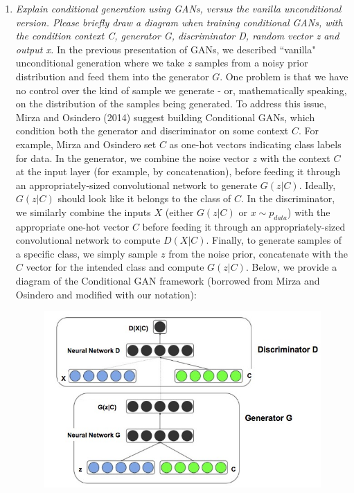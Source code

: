 \documentclass[a4paper]{article}
\begin{document}
\begin{enumerate}
{
}
\item{\textit{Explain conditional generation using GANs, versus the vanilla unconditional version. Please briefly draw a diagram when training conditional GANs, with the condition context C, generator G, discriminator D, random vector z and output x.}
\newline
\newline
In the previous presentation of GANs, we described ``vanilla" unconditional generation where we take $z$ samples from a noisy prior distribution and feed them into the generator $G$. One problem is that we have no control over the kind of sample we generate - or, mathematically speaking, on the distribution of the samples being generated. 
\newline
\newline
To address this issue, Mirza and Osindero (2014) suggest building Conditional GANs, which condition both the generator and discriminator on some context $C$. For example, Mirza and Osindero set $C$ as one-hot vectors indicating class labels for data.
\newline
\newline
In the generator, we combine the noise vector $z$ with the context $C$ at the input layer (for example, by concatenation), before feeding it through an appropriately-sized convolutional network to generate $G(z|C)$. Ideally, $G(z|C)$ should look like it belongs to the class of $C$. In the discriminator, we similarly combine the inputs $X$ (either $G(z|C)$ or $x \sim p_{data}$) with the appropriate one-hot vector $C$ before feeding it through an appropriately-sized convolutional network to compute $D(X|C)$. Finally, to generate samples of a specific class, we simply sample $z$ from the noise prior, concatenate with the $C$ vector for the intended class and compute $G(z|C)$. 
\newline
\newline
Below, we provide a diagram of the Conditional GAN framework (borrowed from Mirza and Osindero and modified with our notation):
\begin{figure}[H]
  \includegraphics[scale=3]{images/my_conditional_gan.jpg}
  \label{fig:boat1}
\end{figure}

}
\end{enumerate}
\end{document}
